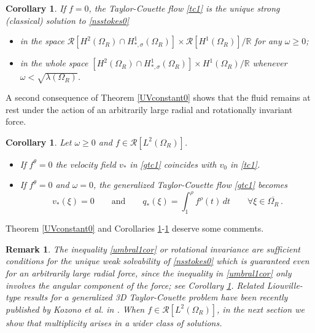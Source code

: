 \documentclass[a4paper,11pt]{article}
\newtheorem{corollary}[theorem]{Corollary}
\newtheorem{remark}[theorem]{Remark}
\numberwithin{equation}{section}
\numberwithin{figure}{section}
\begin{document}
\begin{corollary}\label{UVconstant0cor}
If $f=0$, the Taylor-Couette flow \eqref{tc1} is the unique strong (classical) solution to \eqref{nsstokes0}
\begin{itemize}
\item in the space $\mathcal{R}[H^{2}(\Omega_{R}) \cap H^{1}_{*,\sigma}(\Omega_{R})] \times \mathcal{R}[H^{1}(\Omega_{R})]/\mathbb{R}$ for any $\omega \geq 0$;
\item in the whole space $[H^{2}(\Omega_{R}) \cap H^{1}_{*,\sigma}(\Omega_{R})]\times H^{1}(\Omega_{R})/\mathbb{R}$ whenever $\omega < \sqrt{\lambda(\Omega_{R})}$.
\end{itemize}
\end{corollary}

A second consequence of Theorem \ref{UVconstant0} shows that the fluid remains at rest under the action of an arbitrarily
large radial and rotationally invariant force.

\begin{corollary} \label{atrest}
Let $\omega \geq 0$ and $f \in \mathcal{R}[L^{2}(\Omega_{R})]$.
\begin{itemize}	
\item If $f^{\theta}=0$ the velocity field $v_{*}$ in \eqref{gtc1} coincides with $v_{0}$ in \eqref{tc1}.
\item If $f^{\theta}=0$ and $\omega=0$, the generalized Taylor-Couette flow \eqref{gtc1} becomes
$$
v_{*}(\xi) = 0 \qquad \text{and} \qquad q_{*}(\xi) =  \int_{1}^{\rho} f^{\rho}(t) \, dt \qquad \forall \xi \in \overline{\Omega_{R}} \, .
$$
\end{itemize}
\end{corollary}

Theorem \ref{UVconstant0} and Corollaries \ref{UVconstant0cor}-\ref{atrest} deserve some comments.

\begin{remark}
The inequality \eqref{umbral1cor} or rotational invariance are sufficient conditions for the unique weak solvability
of \eqref{nsstokes0} which is guaranteed even for an arbitrarily large radial force, since the inequality in \eqref{umbral1cor} only involves
the angular component of the force; see Corollary \ref{atrest}. Related Liouville-type results for a generalized 3D Taylor-Couette problem have been recently published by Kozono et al. in \cite{kozono2023liouville}.
When $f \in \mathcal{R}[L^{2}(\Omega_{R})]$, in the next section we show that multiplicity arises in a wider class of solutions.
\end{remark}
\end{document}
